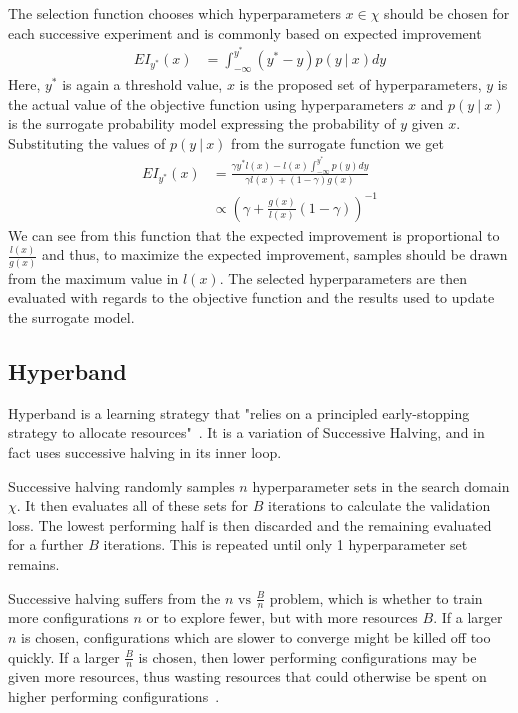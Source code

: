 The selection function chooses which hyperparameters $x \in \chi$ should be chosen for each successive experiment and is commonly based on expected improvement~\cite{bayesiantds}
\begin{align}
	EI_{y^*}(x) &= \int_{-\infty}^{y^*} (y^* - y) p(y~|~x)dy
\end{align}
Here, $y^*$ is again a threshold value, $x$ is the proposed set of hyperparameters, $y$ is the actual value of the objective function using hyperparameters $x$ and $p(y~|~x)$ is the surrogate probability model expressing the probability of $y$ given $x$.
Substituting the values of $p(y~|~x)$ from the surrogate function we get
\begin{align}
	EI_{y^*}(x) &= \frac{\gamma y^* l(x) - l(x) \int_{-\infty}^{y^*}p(y)dy}{\gamma l(x) + (1 - \gamma)g(x)}\\
	&\propto \left(\gamma + \frac{g(x)}{l(x)} (1 - \gamma)\right)^{-1}
\end{align}
We can see from this function that the expected improvement is proportional to $\frac{l(x)}{g(x)}$ and thus, to maximize the expected improvement, samples should be drawn from the maximum value in $l(x)$.
The selected hyperparameters are then evaluated with regards to the objective function and the results used to update the surrogate model.

\subsection{Hyperband}\label{section:background-hyperband}
Hyperband is a learning strategy that "relies on a principled early-stopping strategy to allocate resources"~\cite{hyperband}. 
It is a variation of Successive Halving, and in fact uses successive halving in its inner loop.

Successive halving randomly samples $n$ hyperparameter sets in the search domain $\chi$.
It then evaluates all of these sets for $B$ iterations to calculate the validation loss.
The lowest performing half is then discarded and the remaining evaluated for a further $B$ iterations.
This is repeated until only 1 hyperparameter set remains.

Successive halving suffers from the $n \text{ vs } \frac{B}{n}$ problem, which is whether to train more configurations $n$ or to explore fewer, but with more resources $B$.
If a larger $n$ is chosen, configurations which are slower to converge might be killed off too quickly.
If a larger $\frac{B}{n}$ is chosen, then lower performing configurations may be given more resources, thus wasting resources that could otherwise be spent on higher performing configurations~\cite{hyperband}.

